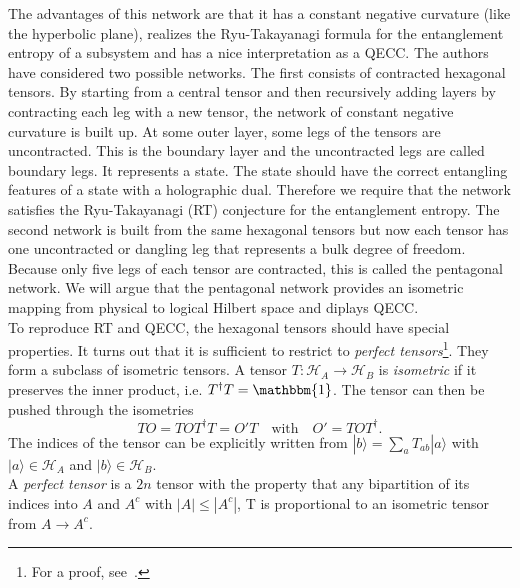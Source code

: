 \documentclass{PoS}
\newcommand{\ket}[1]{|#1\rangle}
\begin{document}
The advantages of this network are that it has a constant negative curvature (like the hyperbolic plane), realizes the Ryu-Takayanagi formula for the entanglement entropy of a subsystem and has a nice interpretation as a QECC. The authors have considered two possible networks. The first consists of contracted hexagonal tensors. By starting from a central tensor and then recursively adding layers by contracting each leg with a new tensor, the network of constant negative curvature is built up. At some outer layer, some legs of the tensors are uncontracted. This is the boundary layer and the uncontracted legs are called boundary legs. It represents a state. The state should have the correct entangling features of a state with a holographic dual. Therefore we require that the network satisfies the Ryu-Takayanagi (RT) conjecture for the entanglement entropy. The second network is built from the same hexagonal tensors but now each tensor has one uncontracted or dangling leg that represents a bulk degree of freedom. Because only five legs of each tensor are contracted, this is called the pentagonal network. We will argue that the pentagonal network provides an isometric mapping from physical to logical Hilbert space and diplays QECC.\\

To reproduce RT and QECC, the hexagonal tensors should have special properties. It turns out that it is sufficient to restrict to \textit{perfect tensors}\footnote{For a proof, see~\cite{Pastawski:2015qua}.}. They form a subclass of isometric tensors. A tensor $T:\mathcal{H}_A\rightarrow \mathcal{H}_B$ is \textit{isometric} if it preserves the inner product, i.e. $T^\dagger T = \mathbbm{1}$. The tensor can then be pushed through the isometries
\begin{equation}
TO = TOT^\dagger T = O'T \quad \text{with} \quad O'=T O T^\dagger.
\end{equation}
The indices of the tensor can be explicitly written from $\ket{b} = \sum\limits_a T_{ab}\ket{a}$ with $\ket{a}\in \mathcal{H}_A$ and $\ket{b}\in\mathcal{H}_B$.\\

A \textit{perfect tensor} is a $2n$ tensor with the property that any bipartition of its indices into $A$ and $A^c$ with $\left|A\right|\leq \left|A^c\right|$, T is proportional to an isometric tensor from $A\rightarrow A^c$.\\
\end{document}
